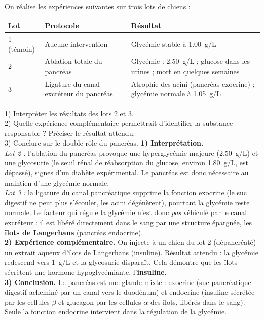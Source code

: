 \documentclass[11pt]{article}
\newcommand{\cle}[1]{{\popxbold\color{popdark}#1}}
\begin{document}
\begin{exoresolu}
On réalise les expériences suivantes sur trois lots de chiens :
\begin{center}
\begin{tabularx}{\linewidth}{|l|X|X|}\hline
\rowcolor{popblueL} Lot & Protocole & Résultat \\ \hline
1 (témoin) & Aucune intervention & Glycémie stable à \SI{1,00}{g/L} \\ \hline
2 & Ablation totale du pancréas & Glycémie : \SI{2,50}{g/L} ; glucose dans les urines ; mort en quelques semaines \\ \hline
3 & Ligature du canal excréteur du pancréas & Atrophie des acini (pancréas exocrine) ; glycémie normale à \SI{1,05}{g/L} \\ \hline
\end{tabularx}
\end{center}
1) Interpréter les résultats des lots 2 et 3.\\
2) Quelle expérience complémentaire permettrait d'identifier la substance responsable ? Préciser le résultat attendu.\\
3) Conclure sur le double rôle du pancréas.
\tcblower
\textbf{1) Interprétation.}\\
\emph{Lot 2 :} l'ablation du pancréas provoque une hyperglycémie majeure (\SI{2,50}{g/L}) et une glycosurie (le seuil rénal de réabsorption du glucose, environ \SI{1,80}{g/L}, est dépassé), signes d'un diabète expérimental. Le pancréas est donc nécessaire au maintien d'une glycémie normale.\\
\emph{Lot 3 :} la ligature du canal pancréatique supprime la fonction exocrine (le suc digestif ne peut plus s'écouler, les acini dégénèrent), pourtant la glycémie reste normale. Le facteur qui régule la glycémie n'est donc \emph{pas} véhiculé par le canal excréteur : il est libéré directement dans le sang par une structure épargnée, les \textbf{îlots de Langerhans} (pancréas endocrine).\\[2mm]
\textbf{2) Expérience complémentaire.} On injecte à un chien du lot 2 (dépancréaté) un extrait aqueux d'îlots de Langerhans (insuline). Résultat attendu : la glycémie redescend vers \SI{1}{g/L} et la glycosurie disparaît. Cela démontre que les îlots sécrètent une hormone hypoglycémiante, l'\textbf{insuline}.\\[2mm]
\textbf{3) Conclusion.} Le pancréas est une \cle{glande mixte} : exocrine (suc pancréatique digestif acheminé par un canal vers le duodénum) et endocrine (insuline sécrétée par les cellules $\beta$ et glucagon par les cellules $\alpha$ des îlots, libérés dans le sang). Seule la fonction endocrine intervient dans la régulation de la glycémie.
\end{exoresolu}
\end{document}
